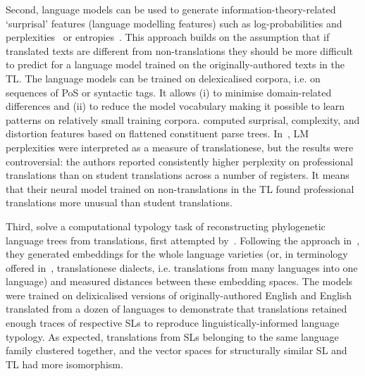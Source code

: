 Second, language models can be used to generate information-theory-related `surprisal' features (language modelling features) such as log-probabilities and perplexities~\cite{Rubino2016,Bizzoni2021,Pylypenko2021} or entropies~\cite{Nikolaev2020,Hu2021}. This approach builds on the assumption that if translated texts are different from non-translations they should be more difficult to predict for a language model trained on the originally-authored texts in the TL. The language models can be trained on delexicalised corpora, i.e. on sequences of PoS or syntactic tags. It allows (i) to minimise domain-related differences and (ii) to reduce the model vocabulary making it possible to learn patterns on relatively small training corpora. \citet{Rubino2016} computed surprisal, complexity, and distortion features based on flattened constituent parse trees.
In~\citet{Bizzoni2021}, \gls{LM} perplexities were interpreted as a measure of translationese, but the results were controversial: the authors reported consistently higher perplexity on professional translations than on student translations across a number of registers. It means that their neural model trained on non-translations in the TL found professional translations more unusual than student translations.


Third, \citet{Chowdhury2020,Chowdhury2021} solve a computational typology task of reconstructing phylogenetic language trees from translations, first attempted by~\citet{Rabinovich2017}. Following the approach in~\citet{Bjerva2019}, they generated embeddings for the whole language varieties (or, in terminology offered in~\citet{Koppel2011}, translationese dialects, i.e. translations from many languages into one language) and measured distances between these embedding spaces. The models were trained on delixicalised versions of originally-authored English and English translated from a dozen of languages to demonstrate that translations retained enough traces of respective SLs to reproduce linguistically-informed language typology. As expected, translations from SLs belonging to the same language family clustered together, and the vector spaces for structurally similar SL and TL had more isomorphism. 

